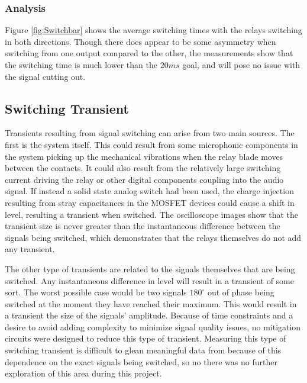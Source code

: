 		\subsubsection{Analysis}

		Figure \ref{fig:Switchbar} shows the average switching times with the relays switching in both directions.  Though there does appear to be some asymmetry when switching from one output compared to the other, the measurements show that the switching time is much lower than the $20ms$ goal, and will pose no issue with the signal cutting out.


	\subsection{Switching Transient}

	Transients resulting from signal switching can arise from two main sources. The first is the system itself.  This could result from some microphonic components in the system picking up the mechanical vibrations when the relay blade moves between the contacts. It could also result from the relatively large switching current driving the relay or other digital components coupling into the audio signal. If instead a solid state analog switch had been used, the charge injection resulting from stray capacitances in the MOSFET devices could cause a shift in level, resulting a transient when switched.  The oscilloscope images show that the transient size is never greater than the instantaneous difference between the signals being switched, which demonstrates that the relays themselves do not add any transient.

	The other type of transients are related to the signals themselves that are being switched.  Any instantaneous difference in level will result in a transient of some sort.  The worst possible case would be two signals $180^\circ$ out of phase being switched at the moment they have reached their maximum.  This would result in a transient the size of the signals' amplitude.  Because of time constraints and a desire to avoid adding complexity to minimize signal quality issues, no mitigation circuits were designed to reduce this type of transient.  Measuring this type of switching transient is difficult to glean meaningful data from because of this dependence on the exact signals being switched, so no there was no further exploration of this area during this project.